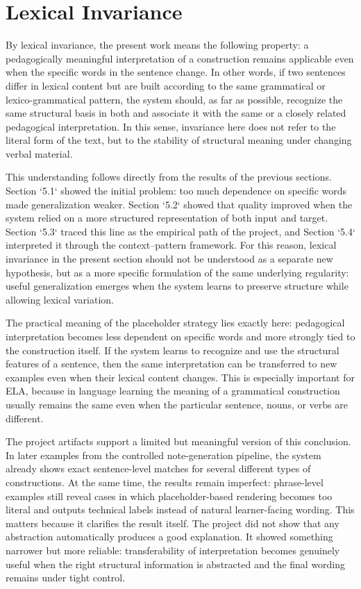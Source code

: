 \documentclass[12pt,a4paper,oneside]{report}
\begin{document}
\section{Lexical Invariance}

By lexical invariance, the present work means the following property: a pedagogically meaningful interpretation of a construction remains applicable even when the specific words in the sentence change. In other words, if two sentences differ in lexical content but are built according to the same grammatical or lexico-grammatical pattern, the system should, as far as possible, recognize the same structural basis in both and associate it with the same or a closely related pedagogical interpretation. In this sense, invariance here does not refer to the literal form of the text, but to the stability of structural meaning under changing verbal material.

This understanding follows directly from the results of the previous sections. Section `5.1` showed the initial problem: too much dependence on specific words made generalization weaker. Section `5.2` showed that quality improved when the system relied on a more structured representation of both input and target. Section `5.3` traced this line as the empirical path of the project, and Section `5.4` interpreted it through the context--pattern framework. For this reason, lexical invariance in the present section should not be understood as a separate new hypothesis, but as a more specific formulation of the same underlying regularity: useful generalization emerges when the system learns to preserve structure while allowing lexical variation.

The practical meaning of the placeholder strategy lies exactly here: pedagogical interpretation becomes less dependent on specific words and more strongly tied to the construction itself. If the system learns to recognize and use the structural features of a sentence, then the same interpretation can be transferred to new examples even when their lexical content changes. This is especially important for ELA, because in language learning the meaning of a grammatical construction usually remains the same even when the particular sentence, nouns, or verbs are different.

The project artifacts support a limited but meaningful version of this conclusion. In later examples from the controlled note-generation pipeline, the system already shows exact sentence-level matches for several different types of constructions. At the same time, the results remain imperfect: phrase-level examples still reveal cases in which placeholder-based rendering becomes too literal and outputs technical labels instead of natural learner-facing wording. This matters because it clarifies the result itself. The project did not show that any abstraction automatically produces a good explanation. It showed something narrower but more reliable: transferability of interpretation becomes genuinely useful when the right structural information is abstracted and the final wording remains under tight control.
\end{document}
